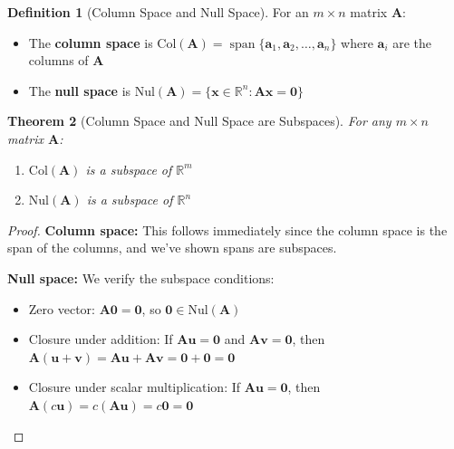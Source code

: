 \documentclass[12pt]{article}
\numberwithin{equation}{section}
\newcommand{\vect}[1]{\boldsymbol{#1}}   %
\newcommand{\mat}[1]{\mathbf{#1}}        %
\newcommand{\Span}{\operatorname{span}}
\theoremstyle{plain}
\newtheorem{theorem}{Theorem}[section]
\theoremstyle{definition}
\newtheorem{definition}[theorem]{Definition}
\theoremstyle{remark}
\begin{document}
\begin{definition}[Column Space and Null Space]
For an $m \times n$ matrix $\mat{A}$:
\begin{itemize}
\item The \textbf{column space} is $\text{Col}(\mat{A}) = \Span\{\vect{a}_1, \vect{a}_2, \ldots, \vect{a}_n\}$ where $\vect{a}_i$ are the columns of $\mat{A}$
\item The \textbf{null space} is $\text{Nul}(\mat{A}) = \{\vect{x} \in \mathbb{R}^n : \mat{A}\vect{x} = \vect{0}\}$
\end{itemize}
\end{definition}

\begin{theorem}[Column Space and Null Space are Subspaces]
For any $m \times n$ matrix $\mat{A}$:
\begin{enumerate}
\item $\text{Col}(\mat{A})$ is a subspace of $\mathbb{R}^m$
\item $\text{Nul}(\mat{A})$ is a subspace of $\mathbb{R}^n$
\end{enumerate}
\end{theorem}

\begin{proof}
\textbf{Column space:} This follows immediately since the column space is the span of the columns, and we've shown spans are subspaces.

\textbf{Null space:} We verify the subspace conditions:
\begin{itemize}
\item Zero vector: $\mat{A}\vect{0} = \vect{0}$, so $\vect{0} \in \text{Nul}(\mat{A})$
\item Closure under addition: If $\mat{A}\vect{u} = \vect{0}$ and $\mat{A}\vect{v} = \vect{0}$, then $\mat{A}(\vect{u} + \vect{v}) = \mat{A}\vect{u} + \mat{A}\vect{v} = \vect{0} + \vect{0} = \vect{0}$
\item Closure under scalar multiplication: If $\mat{A}\vect{u} = \vect{0}$, then $\mat{A}(c\vect{u}) = c(\mat{A}\vect{u}) = c\vect{0} = \vect{0}$
\end{itemize}
\end{proof}
\end{document}
